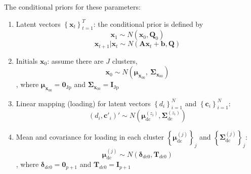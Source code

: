 \documentclass[]{article}
\begin{document}
The conditional priors for these parameters:
\begin{enumerate}
	\def\labelenumi{(\arabic{enumi})}
	\item
	Latent vectors \(\left\{ \mathbf{x}_{t} \right\}_{t=1}^T\): the conditional prior is
	defined by
	\[\mathbf{x}_{1} \sim N(\mathbf{x}_{0},\mathbf{Q}_{0})\]
	\[\mathbf{x}_{t + 1}|\mathbf{x}_{t} \sim N(\mathbf{A}\mathbf{x}_{t} + \mathbf{b},\mathbf{Q})\]
	\item
	Initials \(\mathbf{x}_{0}\): assume there are \(J\) clusters,
	\[\mathbf{x}_{0} \sim N(\bm{\mu}_{\mathbf{x}_{00}},\ \mathbf{\Sigma}_{\mathbf{x}_{00}})\]
	, where \(\bm{\mu}_{\mathbf{x}_{00}} = \mathbf{0}_{\text{Jp}}\) and \(\mathbf{\Sigma}_{\mathbf{x}_{00}} = \mathbf{I}_{\text{Jp}}\)
	\item
	Linear mapping (loading) for latent vectors
	\(\left\{ d_{i} \right\}_{i = 1}^{N}\) and
	\(\left\{ \mathbf{c}_{i} \right\}_{i = 1}^{N}\):
	\[\left( d_{i},\mathbf{c}'_{i} \right)' \sim N(\bm{\mu}_{\text{dc}}^{\left( z_{i} \right)},\mathbf{\Sigma}_{\text{dc}}^{(z_{i})})\]
	\item
	Mean and covariance for loading in each cluster
	\(\left\{ \bm{\mu}_{\text{dc}}^{(j)} \right\}_{j}\) and
	\(\left\{ \mathbf{\Sigma}_{\text{dc}}^{(j)} \right\}_{j}\):
	\[\bm{\mu}_{\text{dc}}^{(j)} \sim N(\mathbf{\delta}_{dc0},\mathbf{T}_{dc0})\]
	, where \(\bm{\delta}_{dc0} = \mathbf{0}_{p + 1}\) and
	\(\mathbf{T}_{dc0} = \mathbf{I}_{p + 1}\)
	

\end{enumerate}
\end{document}

